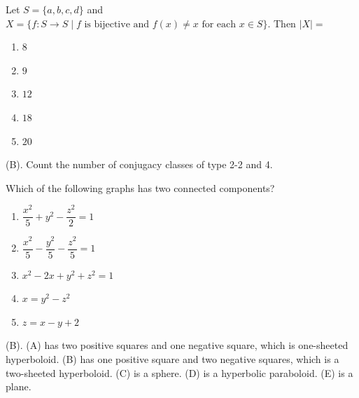\begin{exercise}
Let $S=\{a,b,c,d\}$ and $X=\{f:S\to S\mid f\text{ is bijective and }f(x)\neq x
\text{ for each }x\in S\}$. Then $|X| = $
\begin{enumerate}[label=(\Alph*)]
    \item $8$
    \item $9$
    \item $12$
    \item $18$
    \item $20$
\end{enumerate}
\end{exercise}
\begin{solution}
(B). Count the number of conjugacy classes of type 2-2 and 4.
\end{solution}

\begin{exercise}
Which of the following graphs has two connected components?
\begin{enumerate}[label=(\Alph*)]
    \item $\dfrac{x^2}{5}+y^2-\dfrac{z^2}{2}=1$
    \item $\dfrac{x^2}{5}-\dfrac{y^2}{5}-\dfrac{z^2}{5}=1$
    \item $x^2-2x+y^2+z^2=1$
    \item $x=y^2-z^2$
    \item $z=x-y+2$
\end{enumerate}
\end{exercise}
\begin{solution}
(B). (A) has two positive squares and one negative square, which is one-sheeted 
hyperboloid. (B) has one positive square and two negative squares, which is a 
two-sheeted hyperboloid. (C) is a sphere. (D) is a hyperbolic paraboloid. 
(E) is a plane.
\end{solution}

